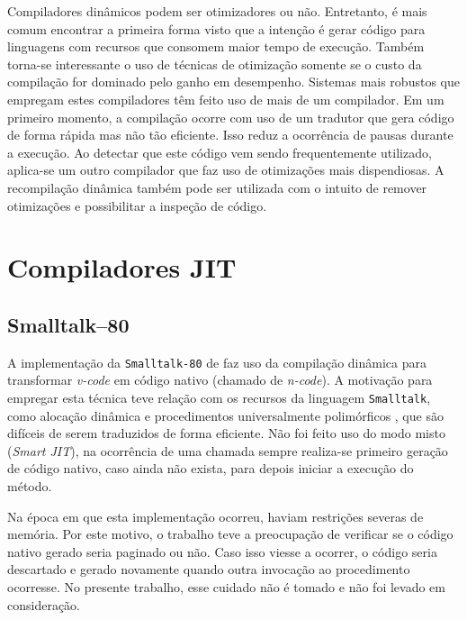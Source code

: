 Compiladores dinâmicos podem ser otimizadores ou não. Entretanto, é
mais comum encontrar a primeira forma visto que a intenção é gerar
código para linguagens com recursos que consomem maior tempo de
execução. Também torna-se interessante o uso de técnicas de otimização somente
se o custo da compilação for dominado pelo ganho em desempenho.
 Sistemas mais robustos \cite{holzle, judo, suganuma_ibm}
que empregam estes compiladores têm feito uso de mais de um
compilador. Em um primeiro momento, a compilação ocorre com uso de um
tradutor que gera código de forma rápida mas não tão eficiente. Isso
reduz a ocorrência de pausas durante a execução. Ao
detectar que este código vem sendo frequentemente utilizado,
aplica-se um outro compilador que faz uso de otimizações mais
dispendiosas. A recompilação dinâmica \cite{holzle} também pode ser
utilizada com o intuito de remover otimizações e possibilitar a inspeção
de código.



\section{Compiladores JIT}


\subsection{Smalltalk--80}

A implementação da \texttt{Smalltalk-80} \cite{bluebook} de
 faz uso da compilação dinâmica para
transformar \textit{v-code} em código nativo (chamado de
\textit{n-code}). A motivação para empregar esta técnica teve relação
com os recursos da linguagem \texttt{Smalltalk}, como alocação dinâmica e
procedimentos universalmente polimórficos \cite{sebesta}, que são
difíceis de serem traduzidos de forma eficiente. Não foi feito uso do
modo misto (\textit{Smart JIT}), na ocorrência de uma chamada sempre
realiza-se primeiro geração de código nativo, caso ainda não exista,
para depois iniciar a execução do método.

Na época em que esta implementação ocorreu, haviam restrições severas
de memória. Por este motivo, o trabalho teve a preocupação de verificar
se o código nativo gerado seria paginado ou não. Caso isso viesse a
ocorrer, o código seria descartado e gerado novamente quando outra
invocação ao procedimento ocorresse. No presente trabalho, esse cuidado
não é tomado e não foi levado em consideração.

